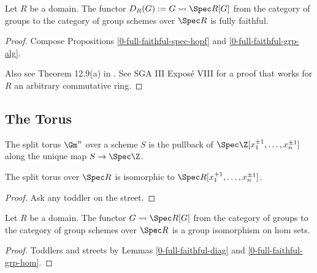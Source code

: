 \begin{theorem}
  \label{0-full-faithful-diag}
  \lean{}
  \leanok

  Let $R$ be a domain.
  The functor $D_R(G) := G \rightsquigarrow \Spec R[G]$ from the category of groups to the category of group schemes over $\Spec R$ is fully faithful.
\end{theorem}
\begin{proof}
  \leanok

  Compose Propositions \ref{0-full-faithful-spec-hopf} and \ref{0-full-faithful-grp-alg}.

  Also see Theorem 12.9(a) in \cite{Milne_2017}. See SGA III Exposé VIII for a proof that works for $R$ an arbitrary commutative ring.
\end{proof}


\subsection{The Torus}


\begin{definition}
  \label{0-torus}
  \leanok

  The split torus $\Gm^n$ over a scheme $S$ is the pullback of
  $\Spec \Z[x_1^{\pm 1}, \dotsc, x_n^{\pm 1}]$ along the unique map $S \to \Spec \Z$.
\end{definition}


\begin{lemma}
  \label{0-torus-spec}
  \leanok

  The split torus over $\Spec R$ is isomorphic to $\Spec R[x_1^{\pm 1}, \dotsc, x_n^{\pm 1}]$.
\end{lemma}
\begin{proof}
  \uses{}

  Ask any toddler on the street.
\end{proof}


\begin{lemma}
  \label{0-diag-hom}

  Let $R$ be a domain.
  The functor $G \rightsquigarrow \Spec R[G]$ from the category of groups to the category of group schemes over $\Spec R$ is a group isomorphism on hom sets.
\end{lemma}
\begin{proof}

  Toddlers and streets by Lemmas \ref{0-full-faithful-diag} and \ref{0-full-faithful-grp-hom}.
\end{proof}


